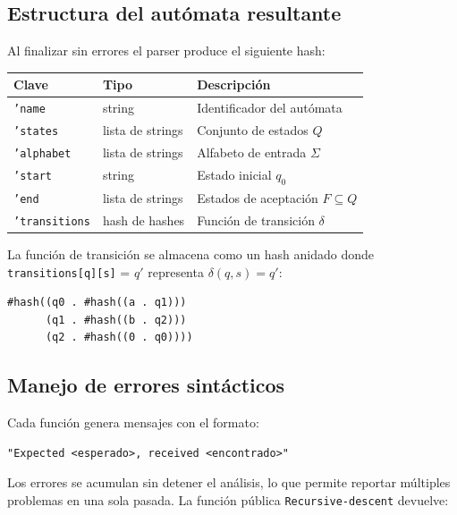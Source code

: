 \documentclass{article}
\begin{document}
\subsection{Estructura del autómata resultante}

Al finalizar sin errores el parser produce el siguiente hash:

\begin{center}
\begin{tabular}{|l|l|l|}
\hline
\textbf{Clave}        & \textbf{Tipo}         & \textbf{Descripción} \\
\hline
\texttt{'name}        & string                & Identificador del autómata \\
\texttt{'states}      & lista de strings      & Conjunto de estados $Q$ \\
\texttt{'alphabet}    & lista de strings      & Alfabeto de entrada $\Sigma$ \\
\texttt{'start}       & string                & Estado inicial $q_0$ \\
\texttt{'end}         & lista de strings      & Estados de aceptación $F \subseteq Q$ \\
\texttt{'transitions} & hash de hashes        & Función de transición $\delta$ \\
\hline
\end{tabular}
\end{center}

La función de transición se almacena como un hash anidado donde
\texttt{transitions[q][s]} = $q'$ representa $\delta(q, s) = q'$:

\begin{verbatim}
#hash((q0 . #hash((a . q1)))
      (q1 . #hash((b . q2)))
      (q2 . #hash((0 . q0))))
\end{verbatim}

\subsection{Manejo de errores sintácticos}

Cada función genera mensajes con el formato:

\begin{verbatim}
"Expected <esperado>, received <encontrado>"
\end{verbatim}

Los errores se acumulan sin detener el análisis, lo que permite reportar múltiples
problemas en una sola pasada.
La función pública \texttt{Recursive-descent} devuelve:
\end{document}

